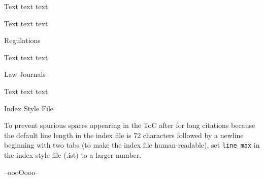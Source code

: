 \p Text text text 

\bigskip 

\p Text text text 

\bigskip 


Regulations

\p Text text text 

\bigskip 


Law Journals

\p Text text text 

\bigskip 


Index Style File

\p To prevent spurious spaces appearing in the ToC after \markthis{[} for long citations because the default line length in the index file is 72 characters followed by a newline beginning with two tabs (to make the index file human-readable), set \verb|line_max| in the index style file (.ist) to a larger number.



\bigskip
\bigskip
\hfill --oooOooo--\hfill\ 
\let\twocolumn\xoldtwocolumn
\printindex[general]



